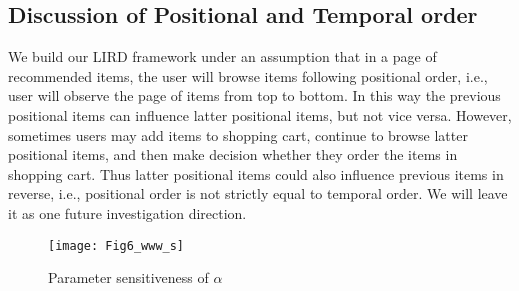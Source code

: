 \subsection{Discussion of Positional and Temporal order}
%
%
%

We build our LIRD framework under an assumption that in a page of recommended items, the user will browse items following positional order, i.e., user will observe the page of items from top to bottom. In this way the previous positional items can influence latter positional items, but not vice versa. However, sometimes users may add items to shopping cart, continue to browse latter positional items, and then make decision whether they order the items in shopping cart. Thus latter positional items could also influence previous items in reverse, i.e., positional order is not strictly equal to temporal order. We will leave it as one future investigation direction. 


\begin{figure}[t]
	\centering
	\texttt{[image: Fig6\_www\_s]}
	\caption{Parameter sensitiveness of $\alpha$}
	\label{fig:parameters}
\end{figure}